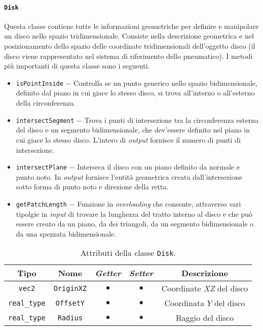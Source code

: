 \paragraph{\texttt{Disk}}
Questa classe contiene tutte le informazioni geometriche per definire e manipolare un disco nello spazio tridimensionale. Consiste nella descrizione geometrica e nel posizionamento dello spazio delle coordinate tridimensionali dell'oggetto disco (il disco viene rappresentato nel sistema di riferimento dello pneumatico). I metodi più importanti di questa classe sono i seguenti.
\begin{itemize}
	\item \texttt{isPointInside} $-$ Controlla se un punto generico nello spazio bidimensionale, definito dal piano in cui giace lo stesso disco, si trova all'interno o all'esterno della circonferenza.
	\item \texttt{intersectSegment} $-$ Trova i punti di intersezione tra la circonferenza esterna del disco e un segmento bidimensionale, che dev'essere definito nel piano in cui giace lo stesso disco. L'intero di \textit{output} fornisce il numero di punti di intersezione.
	\item \texttt{intersectPlane} $-$ Interseca il disco con un piano definito da normale e punto noto. In \textit{output} fornisce l'entità geometrica creata dall'intersezione sotto forma di punto noto e direzione della retta.
	\item \texttt{getPatchLength} $-$ Funzione in \textit{overloading} che consente, attraverso vari tipolgie in \textit{input} di trovare la lunghezza del tratto interno al disco e che può essere creato da un piano, da dei triangoli, da un segmento bidimensionale o da una spezzata bidimensionale.
\end{itemize}
\begin{table}[h!]
	\centering
	\begin{tabular}{|c|c|c|c|c|}
		\hline 
		\textbf{Tipo} & \textbf{Nome} & \textit{\textbf{Getter}} & \textit{\textbf{Setter}} & \textbf{Descrizione} \\ \hline 
		\texttt{vec2} & \texttt{OriginXZ} & $\bullet$ & $\bullet$ & Coordinate \textit{XZ} del disco \\ \hline 
		\texttt{real\_type} & \texttt{OffsetY} & $\bullet$ & $\bullet$ & Coordinata $Y$ del disco \\ \hline
		\texttt{real\_type} & \texttt{Radius} & $\bullet$ & $\bullet$ & Raggio del disco \\ \hline
	\end{tabular}
	\caption{Attributi della classe \texttt{Disk}.}
	\label{}
\end{table}
%
